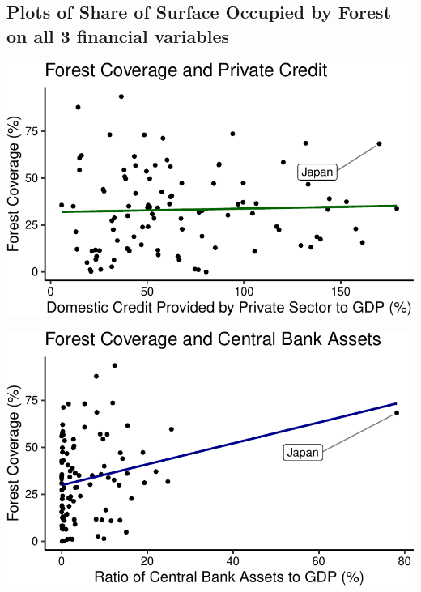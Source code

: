 \documentclass[
  12pt,
]{article}
\let\origfigure\figure
\let\endorigfigure\endfigure
\renewenvironment{figure}[1][2] {
    \expandafter\origfigure\expandafter[H]
} {
    \endorigfigure
}
\begin{document}
\hypertarget{plots-of-share-of-surface-occupied-by-forest-on-all-3-financial-variables}{%
\subsection{Plots of Share of Surface Occupied by Forest on all 3
financial
variables}\label{plots-of-share-of-surface-occupied-by-forest-on-all-3-financial-variables}}

\begin{figure}
\centering
\includegraphics{CulbersonDeAngeliShapiro_ENV872_Project_files/figure-latex/unnamed-chunk-1-1.pdf}
\caption{Forest Coverage and Private Credit}
\end{figure}

\begin{figure}
\centering
\includegraphics{CulbersonDeAngeliShapiro_ENV872_Project_files/figure-latex/fccba-1.pdf}
\caption{Forest Coverage and Central Bank Assets}
\end{figure}
\end{document}
